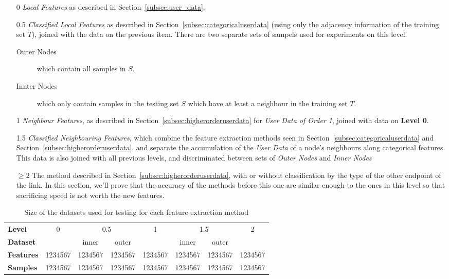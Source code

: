 \begin{enumerate}
	\item[0] \emph{Local Features} as described in Section~\ref{subsec:user_data}.
	\item[0.5] \emph{Classified Local Features} as described in Section~\ref{subsec:categoricaluserdata} (using only the adjacency information of the training set $T$), joined with the data on the previous item. There are two separate sets of sampels used for experiments on this level.
	\begin{description}
		\item[Outer Nodes] which contain all samples in $S$.
		\item[Innter Nodes] which only contain samples in the testing set $S$ which have at least a neighbour in the training set $T$.
	\end{description}
	\item[1] \emph{Neighbour Features}, as described in Section~\ref{subsec:higherorderuserdata} for \emph{User Data of Order 1}, joined with data on \textbf{Level 0}.
	\item[1.5] \emph{Classified Neighbouring Features}, which combine the feature extraction methods seen in Section~\ref{subsec:categoricaluserdata} and Section~\ref{subsec:higherorderuserdata}, and separate the accumulation of the \emph{User Data} of a node's neighbours along categorical features. This data is also joined with all previous levels, and discriminated between sets of \emph{Outer Nodes} and \emph{Inner Nodes}
	\item[$\geq 2$] The method described in Section~\ref{subsec:higherorderuserdata}, with or without classification by the type of the other endpoint of the link. In this section, we'll prove that the accuracy of the methods before this one are similar enough to the ones in this level so that sacrificing speed is not worth the new features.
\end{enumerate}

\begin{table}
\centering
\begin{tabular}{>{\bfseries}l c c c c c c c}
\toprule
\textbf{Level} & 0 & \multicolumn{2}{c}{0.5} & 1 & \multicolumn{2}{c}{1.5} & 2 \\
\cmidrule(lr){3-4} \cmidrule(lr){6-7}
\textbf{Dataset} &   & inner     &    outer    &   & inner     &    outer    &   \\
\midrule
Features &\num{1234567}&\num{1234567}&\num{1234567}&\num{1234567}&\num{1234567}&\num{1234567}&\num{1234567}\\
Samples  &\num{1234567}&\num{1234567}&\num{1234567}&\num{1234567}&\num{1234567}&\num{1234567}&\num{1234567}\\
\bottomrule
\end{tabular}
\caption{Size of the datasets used for testing for each feature extraction method}
\label{tab:datasettable}
\end{table}

